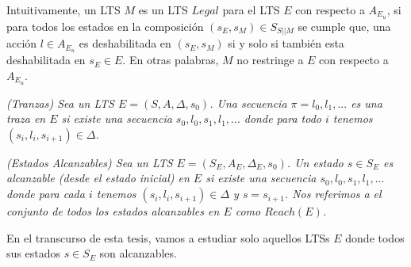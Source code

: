 Intuitivamente, un LTS $M$ es un LTS $Legal$ para el LTS $E$ con respecto a $A_{E_u}$, si para todos los estados en la
composición $(s_E,s_M) \in S_{S||M}$ se cumple que, una acción $l \in A_{E_u}$ es deshabilitada en $(s_E,s_M)$ si y solo
si también esta deshabilitada en $s_E \in E$. En otras palabras, $M$ no restringe a $E$ con respecto a $A_{E_u}$.


\begin{nahaDef}
    \emph{(Tranzas) Sea un LTS $E = (S,A,\Delta,s_0)$. Una secuencia $\pi = l_0,l_1,...$ es una traza en $E$ si existe una
    secuencia $s_0,l_0,s_1,l_1,...$ donde para todo $i$ tenemos $(s_i,l_i,s_{i+1}) \in \Delta$.}
\end{nahaDef} 


\begin{nahaDef}
    \emph{(Estados Alcanzables) Sea un LTS $E = (S_E, A_E, \Delta_E, s_0)$. Un estado $s \in S_E$ es alcanzable (desde
    el estado inicial) en $E$ si existe una secuencia $s_0,l_0,s_1,l_1,...$ donde para cada $i$ tenemos
    $(s_i,l_i,s_{i+1}) \in \Delta$ y $s = s_{i+1}$. Nos referimos a el conjunto de todos los estados alcanzables en $E$
    como $Reach(E)$.}
\end{nahaDef} 

En el transcurso de esta tesis, vamos a estudiar solo aquellos LTSs $E$ donde todos sus estados $s \in S_E$ son
alcanzables.
